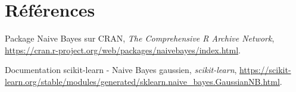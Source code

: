 \documentclass[]{article}
\begin{document}
\newpage

\section{Références}

\begin{thebibliography}{9}

  Package Naive Bayes sur CRAN,
  \textit{The Comprehensive R Archive Network},
  \url{https://cran.r-project.org/web/packages/naivebayes/index.html}.

  Documentation scikit-learn - Naive Bayes gaussien,
  \textit{scikit-learn},
  \url{https://scikit-learn.org/stable/modules/generated/sklearn.naive_bayes.GaussianNB.html}.

\end{thebibliography}
\end{document}
